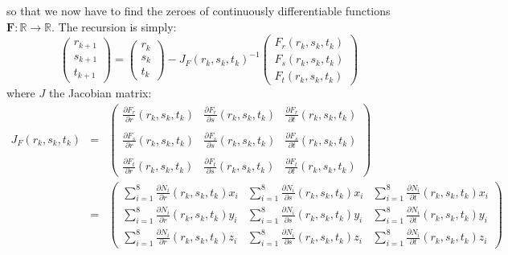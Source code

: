 so that we now have to find the zeroes of continuously differentiable functions ${\bm F}:\mathbb{R} \rightarrow \mathbb{R}$.
The recursion is simply:
\[
\left(
\begin{array}{c}
r_{k+1} \\s_{k+1} \\ t_{k+1}
\end{array}
\right)
=
\left(
\begin{array}{c}
r_{k} \\s_{k} \\ t_{k}
\end{array}
\right)
- J_F(r_k,s_k,t_k) ^{-1} 
\left(
\begin{array}{c}
F_r(r_k,s_k,t_k) \\
F_s(r_k,s_k,t_k)\\
F_t(r_k,s_k,t_k)
\end{array}
\right)
\]
where $J$ the Jacobian matrix:
\begin{eqnarray}
J_F(r_k,s_k,t_k)
&=&
\left(
\begin{array}{ccc}
\frac{\partial F_r}{\partial r}(r_k,s_k,t_k) & \frac{\partial F_r}{\partial s}(r_k,s_k,t_k) & \frac{\partial F_r}{\partial t}(r_k,s_k,t_k) \\\\
\frac{\partial F_s}{\partial r}(r_k,s_k,t_k) & \frac{\partial F_s}{\partial s}(r_k,s_k,t_k) & \frac{\partial F_s}{\partial t}(r_k,s_k,t_k) \\\\
\frac{\partial F_t}{\partial r}(r_k,s_k,t_k) & \frac{\partial F_t}{\partial s}(r_k,s_k,t_k) & \frac{\partial F_t}{\partial t}(r_k,s_k,t_k) 
\end{array}
\right) \nonumber\\
&=&
\left(
\begin{array}{ccc}
\sum\limits_{i=1}^8 \frac{\partial N_i}{\partial r}(r_k,s_k,t_k) x_i &
\sum\limits_{i=1}^8 \frac{\partial N_i}{\partial s}(r_k,s_k,t_k) x_i &
\sum\limits_{i=1}^8 \frac{\partial N_i}{\partial t}(r_k,s_k,t_k) x_i \\
\sum\limits_{i=1}^8 \frac{\partial N_i}{\partial r}(r_k,s_k,t_k) y_i &
\sum\limits_{i=1}^8 \frac{\partial N_i}{\partial s}(r_k,s_k,t_k) y_i &
\sum\limits_{i=1}^8 \frac{\partial N_i}{\partial t}(r_k,s_k,t_k) y_i \\
\sum\limits_{i=1}^8 \frac{\partial N_i}{\partial r}(r_k,s_k,t_k) z_i &
\sum\limits_{i=1}^8 \frac{\partial N_i}{\partial s}(r_k,s_k,t_k) z_i &
\sum\limits_{i=1}^8 \frac{\partial N_i}{\partial t}(r_k,s_k,t_k) z_i 
\end{array}
\right) \nonumber 
\end{eqnarray}
